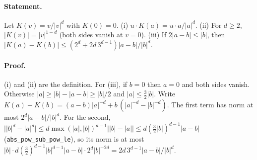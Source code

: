 \paragraph{Statement.} Let $K(v)=v/|v|^d$ with $K(0)=0$. (i) $u\cdot K(a)=u\cdot a/|a|^d$.
(ii) For $d\geq2$, $|K(v)|=|v|^{1-d}$ (both sides vanish at $v=0$). (iii) If $2|a-b|\leq|b|$, then
$|K(a)-K(b)|\leq(2^d+2d\,3^{d-1})|a-b|/|b|^d$.
\paragraph{Proof.} (i) and (ii) are the definition. For (iii), if $b=0$ then $a=0$ and both sides
vanish. Otherwise $|a|\geq|b|-|a-b|\geq|b|/2$ and $|a|\leq\frac32|b|$. Write
$K(a)-K(b)=(a-b)|a|^{-d}+b\,(|a|^{-d}-|b|^{-d})$. The first term has norm at most
$2^d|a-b|/|b|^d$. For the second,
$\bigl||b|^d-|a|^d\bigr|\leq d\max(|a|,|b|)^{d-1}\bigl||b|-|a|\bigr|\leq d(\tfrac32|b|)^{d-1}|a-b|$
(\texttt{abs\_pow\_sub\_pow\_le}), so its norm is at most
$|b|\cdot d(\tfrac32)^{d-1}|b|^{d-1}|a-b|\cdot2^d|b|^{-2d}=2d\,3^{d-1}|a-b|/|b|^d$.
